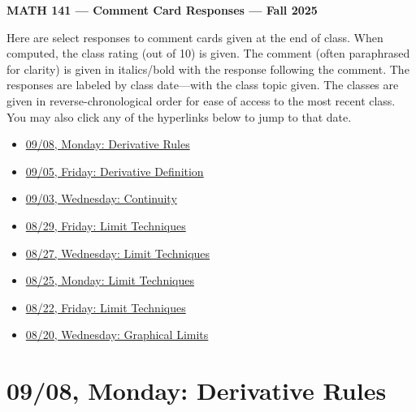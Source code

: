 \documentclass[11pt,letterpaper]{article}
\begin{document}
\begin{center} {\bfseries \LARGE MATH 141 --- Comment Card Responses --- Fall 2025} \end{center}

Here are select responses to comment cards given at the end of class. When computed, the class rating (out of 10) is given. The comment (often paraphrased for clarity) is given in italics/bold with the response following the comment. The responses are labeled by class date---with the class topic given. The classes are given in reverse-chronological order for ease of access to the most recent class. You may also click any of the hyperlinks below to jump to that date.

\begin{itemize}
\item \hyperref[09-08]{09/08, Monday: Derivative Rules}
\item \hyperref[09-05]{09/05, Friday: Derivative Definition}
\item \hyperref[09-03]{09/03, Wednesday: Continuity}
\item \hyperref[08-29]{08/29, Friday: Limit Techniques}
\item \hyperref[08-27]{08/27, Wednesday: Limit Techniques}
\item \hyperref[08-25]{08/25, Monday: Limit Techniques}
\item \hyperref[08-22]{08/22, Friday: Limit Techniques}
\item \hyperref[08-20]{08/20, Wednesday: Graphical Limits}
\end{itemize}

\newpage
\section*{09/08, Monday: Derivative Rules\label{09-08}}
\end{document}
